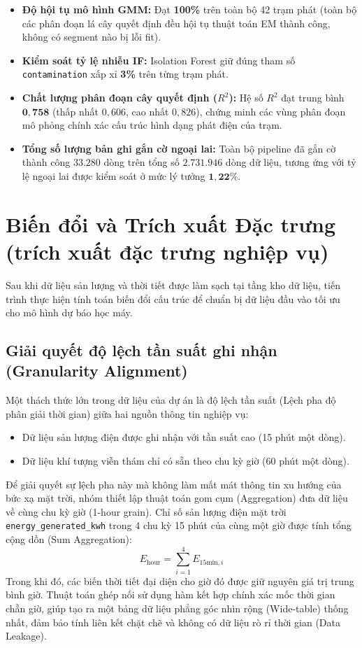 \documentclass[12pt, a4paper]{report}
\begin{document}
\begin{itemize}
    \item \textbf{Độ hội tụ mô hình GMM:} Đạt \textbf{100\%} trên toàn bộ 42 trạm phát (toàn bộ các phân đoạn lá cây quyết định đều hội tụ thuật toán EM thành công, không có segment nào bị lỗi fit).
    \item \textbf{Kiểm soát tỷ lệ nhiễu IF:} Isolation Forest giữ đúng tham số \texttt{contamination} xấp xỉ \textbf{3\%} trên từng trạm phát.
    \item \textbf{Chất lượng phân đoạn cây quyết định ($R^2$):} Hệ số $R^2$ đạt trung bình $\mathbf{0{,}758}$ (thấp nhất $0{,}606$, cao nhất $0{,}826$), chứng minh các vùng phân đoạn mô phỏng chính xác cấu trúc hình dạng phát điện của trạm.
    \item \textbf{Tổng số lượng bản ghi gắn cờ ngoại lai:} Toàn bộ pipeline đã gắn cờ thành công $\mathbf{33.280}$ dòng trên tổng số $\mathbf{2.731.946}$ dòng dữ liệu, tương ứng với tỷ lệ ngoại lai được kiểm soát ở mức lý tưởng $\mathbf{1{,}22\%}$.
\end{itemize}

\section{Biến đổi và Trích xuất Đặc trưng (trích xuất đặc trưng nghiệp vụ)}
\label{sec:transformation}

Sau khi dữ liệu sản lượng và thời tiết được làm sạch tại tầng kho dữ liệu, tiến trình thực hiện tính toán biến đổi cấu trúc để chuẩn bị dữ liệu đầu vào tối ưu cho mô hình dự báo học máy.

\subsection{Giải quyết độ lệch tần suất ghi nhận (Granularity Alignment)}
Một thách thức lớn trong dữ liệu của dự án là độ lệch tần suất (Lệch pha độ phân giải thời gian) giữa hai nguồn thông tin nghiệp vụ:
\begin{itemize}
    \item Dữ liệu sản lượng điện được ghi nhận với tần suất cao (15 phút một dòng).
    \item Dữ liệu khí tượng viễn thám chỉ có sẵn theo chu kỳ giờ (60 phút một dòng).
\end{itemize}

Để giải quyết sự lệch pha này mà không làm mất mát thông tin xu hướng của bức xạ mặt trời, nhóm thiết lập thuật toán gom cụm (Aggregation) đưa dữ liệu về cùng chu kỳ giờ (1-hour grain). Chỉ số sản lượng điện mặt trời \texttt{energy\_generated\_kwh} trong 4 chu kỳ 15 phút của cùng một giờ được tính tổng cộng dồn (Sum Aggregation):
\begin{equation}
E_{\text{hour}} = \sum_{i=1}^{4} E_{15\text{min}, i}
\end{equation}
Trong khi đó, các biến thời tiết đại diện cho giờ đó được giữ nguyên giá trị trung bình giờ. Thuật toán ghép nối sử dụng hàm kết hợp chính xác mốc thời gian chẵn giờ, giúp tạo ra một bảng dữ liệu phẳng góc nhìn rộng (Wide-table) thống nhất, đảm bảo tính liên kết chặt chẽ và không có dữ liệu rò rỉ thời gian (Data Leakage).
\end{document}
